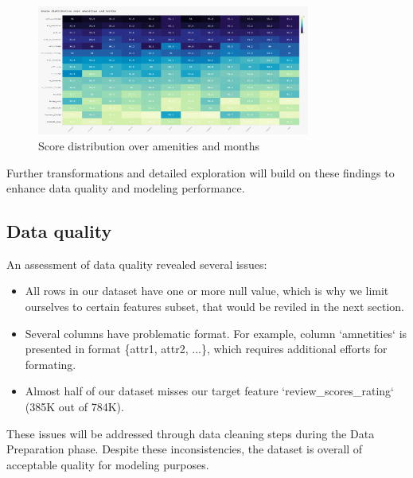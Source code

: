 \vspace{1em}
\begin{figure}[H]
    \centering
    \includegraphics[width=0.8\textwidth]{images/q7_1.jpg}
    \caption{Score distribution over amenities and months}
    \label{fig:figureq15}
\end{figure}


Further transformations and detailed exploration will build on these findings to enhance data quality and modeling performance.



\subsection{Data quality}
\label{sec:dataQuality}
An assessment of data quality revealed several issues:

\begin{itemize}
    \item All rows in our dataset have one or more null value, which is why we limit ourselves to certain features subset, that would be reviled in the next section.
    \item Several columns have problematic format. For example, column `amnetities` is presented in format \{attr1, attr2, ...\}, which requires additional efforts for formating.
    \item Almost half of our dataset misses our target feature `review\_scores\_rating` (385K out of 784K). 
\end{itemize}

These issues will be addressed through data cleaning steps during the Data Preparation phase. Despite these inconsistencies, the dataset is overall of acceptable quality for modeling purposes.
